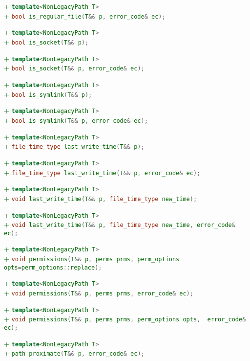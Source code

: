 \documentclass[11pt]{article}
\newcommand{\code}[2][cpp]{\lstinline[language=#1,basicstyle=\small\ttfamily]{#2}}
\newcommand{\tsreplace}[3]{\textcolor{red}{\sout{#1}}#2\textcolor{darkgreen}{#3}}
\begin{document}
\tsreplace{}{}{+ \code{template<NonLegacyPath T>}}\\
\tsreplace{}{}{+ \code{bool is_regular_file(T&& p, error_code& ec);}}

\tsreplace{}{}{+ \code{template<NonLegacyPath T>}}\\
\tsreplace{}{}{+ \code{bool is_socket(T&& p);}}

\tsreplace{}{}{+ \code{template<NonLegacyPath T>}}\\
\tsreplace{}{}{+ \code{bool is_socket(T&& p, error_code& ec);}}

\tsreplace{}{}{+ \code{template<NonLegacyPath T>}}\\
\tsreplace{}{}{+ \code{bool is_symlink(T&& p);}}

\tsreplace{}{}{+ \code{template<NonLegacyPath T>}}\\
\tsreplace{}{}{+ \code{bool is_symlink(T&& p, error_code& ec);}}

\tsreplace{}{}{+ \code{template<NonLegacyPath T>}}\\
\tsreplace{}{}{+ \code{file_time_type last_write_time(T&& p);}}

\tsreplace{}{}{+ \code{template<NonLegacyPath T>}}\\
\tsreplace{}{}{+ \code{file_time_type last_write_time(T&& p, error_code& ec);}}

\tsreplace{}{}{+ \code{template<NonLegacyPath T>}}\\
\tsreplace{}{}{+ \code{void last_write_time(T&& p, file_time_type new_time);}}

\tsreplace{}{}{+ \code{template<NonLegacyPath T>}}\\
\tsreplace{}{}{+ \code{void last_write_time(T&& p, file_time_type new_time, error_code& ec);}}

\tsreplace{}{}{+ \code{template<NonLegacyPath T>}}\\
\tsreplace{}{}{+ \code{void permissions(T&& p, perms prms, perm_options opts=perm_options::replace);}}

\tsreplace{}{}{+ \code{template<NonLegacyPath T>}}\\
\tsreplace{}{}{+ \code{void permissions(T&& p, perms prms, error_code& ec);}}

\tsreplace{}{}{+ \code{template<NonLegacyPath T>}}\\
\tsreplace{}{}{+ \code{void permissions(T&& p, perms prms, perm_options opts,  error_code& ec);}}

\tsreplace{}{}{+ \code{template<NonLegacyPath T>}}\\
\tsreplace{}{}{+ \code{path proximate(T&& p, error_code& ec);}}
\end{document}
